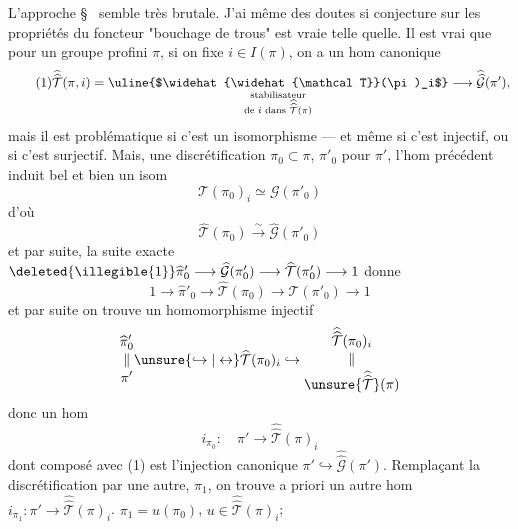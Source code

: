 L'approche  \S\  semble  très brutale. J'ai même des doutes si   conjecture sur les propriétés du foncteur "bouchage de trous" est vraie telle quelle. Il est vrai que pour un groupe profini    $\pi$, si on fixe $i\in I(\pi)$, on a un hom canonique
\[
\tag{1}
\widehat{\widehat{\mathcal T}}(\pi,i)
=\underset{\substack{\text{stabilisateur}\\\text{de }i\text{ dans }\widehat{\widehat{\mathcal T}}(\pi)}}{\text{\uline{$\widehat{\widehat{\mathcal T}}(\pi)_i$}}}
\longrightarrow \widehat{\widehat{\mathcal G}}(\pi'),
\]
mais il est problématique si c'est un isomorphisme --- et même si c'est injectif, ou si c'est surjectif. Mais,  une discrétification $\pi_0\subset\pi$,   $\pi'_0$ pour $\pi'$, l'hom précédent induit bel et bien un isom
\[
\tag{1}
\mathcal T(\pi_0)_i\simeq\mathcal G(\pi'_0)
\]
d'où
\[
\tag{3}
\widehat{\mathcal T}(\pi_0)\xrightarrow{\sim}\widehat{\mathcal G}(\pi'_0)
\]
et par suite, la suite exacte $\deleted{\illegible{1}}\widehat{\pi}'_0\longrightarrow\widehat{\mathcal G}(\pi'_0)\longrightarrow\widehat{\mathcal T}(\pi'_0)\longrightarrow 1$ donne
\[
\tag{4}
1\longrightarrow\widehat{\pi}'_0\longrightarrow\widehat{\mathcal T}(\pi_0)\longrightarrow\widehat{\mathcal T}(\pi'_0)\longrightarrow 1
\]
et par suite on trouve un homomorphisme injectif
\[
\begin{gathered}\widehat{\pi}'_0\\[-0.5ex]\Vert\\[-0.5ex]\pi'\end{gathered}
\unsure{\hookrightarrow|\leftrightarrow}
\widehat{\mathcal T}(\pi_0)_i
\hookrightarrow
\begin{gathered}\widehat{\widehat{\mathcal T}}(\pi_0)_i\\[-0.5ex]\Vert\\[-0.5ex]\unsure{\widehat{\widehat{\mathcal T}}}(\pi)\end{gathered}
\]
donc un hom
\[
\tag{5}
i_{\pi_0}:\quad\pi'\longrightarrow\widehat{\widehat{\mathcal T}}(\pi)_i
\]
dont  composé avec (1) est l'injection canonique $\pi'\hookrightarrow\widehat{\widehat{\mathcal G}}(\pi')$. Remplaçant la discrétification  par une autre, $\pi_1$, on trouve a priori un autre hom $i_{\pi_1}:\pi'\longrightarrow\widehat{\widehat{\mathcal T}}(\pi)_i$.  $\pi_1=u(\pi_0)$, $u\in\widehat{\widehat{\mathcal T}}(\pi)_i$;

